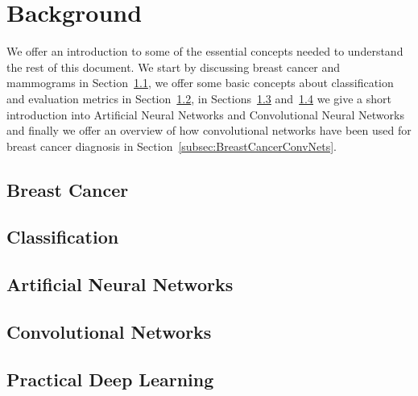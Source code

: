 \documentclass[11pt]{article}
\begin{document}
\section{Background}
\label{sec:Background}
We offer an introduction to some of the essential concepts needed to understand the rest of this document. We start by discussing breast cancer and mammograms in Section~\ref{subsec:BreastCancer}, 
we offer some basic concepts about classification and evaluation metrics in Section~\ref{subsec:Classification}, in Sections~\ref{subsec:ANNs} and~\ref{subsec:ConvNets} we give a short introduction into Artificial Neural Networks and Convolutional Neural Networks and finally we offer an overview of how convolutional networks have been used for breast cancer diagnosis in Section~\ref{subsec:BreastCancerConvNets}.

	\subsection{Breast Cancer}
	\label{subsec:BreastCancer}
	


	\subsection{Classification}
	\label{subsec:Classification}
	

	\subsection{Artificial Neural Networks}
	\label{subsec:ANNs}
	

	\subsection{Convolutional Networks}
	\label{subsec:ConvNets}
	

	\subsection{Practical Deep Learning}
	\label{subsec:PracticalDL}
	
\end{document}
